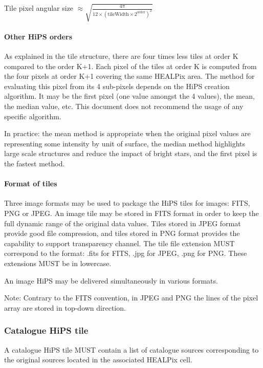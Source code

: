 \documentclass[11pt,a4paper]{ivoa}
\begin{document}
Tile pixel angular size $\approx \sqrt{\frac{4\pi}{12 \times (\mathrm{tileWidth} \times 2^{\mathrm{order}})^2}}$

\paragraph{Other HiPS orders}

As explained in the tile structure, there are four times less tiles at order K compared to the order K+1. Each pixel of the tiles at order K is computed from the four pixels at order K+1 covering the same HEALPix area. The method for evaluating this pixel from its 4 sub-pixels depends on the HiPS creation algorithm. It may be the first pixel (one value amongst the 4 values), the mean, the median value, etc. This document does not recommend the usage of any specific algorithm.

In practice: the mean method is appropriate when the original pixel values are representing some intensity by unit of surface, the median method highlights large scale structures and reduce the impact of bright stars, and the first pixel is the fastest method.

\paragraph{Format of tiles}

Three image formats may be used to package the HiPS tiles for images: FITS, PNG or JPEG. An image tile may be stored in FITS format in order to keep the full dynamic range of the original data values. Tiles stored in JPEG format provide good file compression, and tiles stored in PNG format provides the capability to support transparency channel. The tile file extension MUST correspond to the format: .fits for FITS, .jpg for JPEG, .png for PNG. These extensions MUST be in lowercase.

An image HiPS may be delivered simultaneously in various formats. 

Note: Contrary to the FITS convention, in JPEG and PNG the lines of the pixel array are stored in top-down direction.

\subsubsection{Catalogue HiPS tile}

A catalogue HiPS tile MUST contain a list of catalogue sources corresponding to the original sources located in the associated HEALPix cell.
\end{document}
